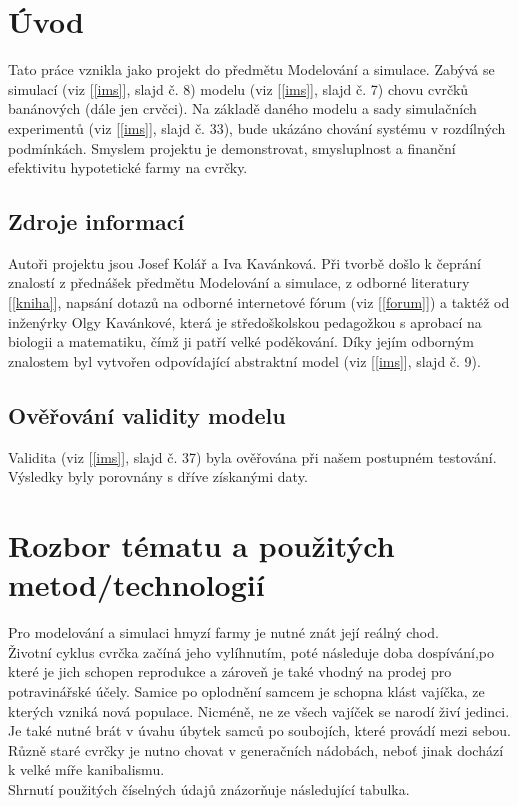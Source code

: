 \documentclass{article}
\begin{document}
    
    \pagestyle{fancy}
    \tableofcontents
    \pagebreak

    \section{Úvod}
    Tato práce vznikla jako projekt do předmětu Modelování a simulace. Zabývá se simulací (viz [\ref{ims}], slajd č. 8)
    modelu (viz [\ref{ims}], slajd č. 7) chovu cvrčků banánových (dále jen crvčci). Na základě daného modelu a sady simulačních experimentů (viz [\ref{ims}], slajd č. 33),
    bude ukázáno chování systému v rozdílných podmínkách. Smyslem projektu je demonstrovat, smysluplnost a finanční efektivitu hypotetické farmy na cvrčky.

    \subsection{Zdroje informací}
    Autoři projektu jsou Josef Kolář a Iva Kavánková. Při tvorbě došlo k čeprání znalostí z přednášek předmětu Modelování a simulace, z odborné literatury
    [\ref{kniha}], napsání dotazů na odborné internetové fórum (viz [\ref{forum}]) a taktéž od inženýrky Olgy Kavánkové, která je středoškolskou pedagožkou s aprobací na biologii
    a matematiku, čímž ji patří velké poděkování. Díky jejím odborným znalostem byl vytvořen odpovídající abstraktní model
    (viz [\ref{ims}], slajd č. 9).

    \subsection{Ověřování validity modelu}
    Validita (viz [\ref{ims}], slajd č. 37) byla ověřována při našem postupném testování. Výsledky byly porovnány s dříve získanými daty.

    \section{Rozbor tématu a použitých metod/technologií}
    Pro modelování a simulaci hmyzí farmy je nutné znát její reálný chod. \\
    Životní cyklus cvrčka začíná jeho vylíhnutím, poté následuje doba dospívání,po které je jich schopen reprodukce a zároveň
    je také vhodný na prodej pro potravinářské účely. Samice po oplodnění samcem je schopna klást vajíčka, ze kterých vzniká
    nová populace. Nicméně, ne ze všech vajíček se narodí živí jedinci. Je také nutné brát v úvahu úbytek samců po soubojích, které provádí mezi sebou. Různě staré cvrčky je nutno chovat v generačních nádobách,
    neboť jinak dochází k velké míře kanibalismu. \\
    Shrnutí použitých číselných údajů znázorňuje následující tabulka.
\end{document}
